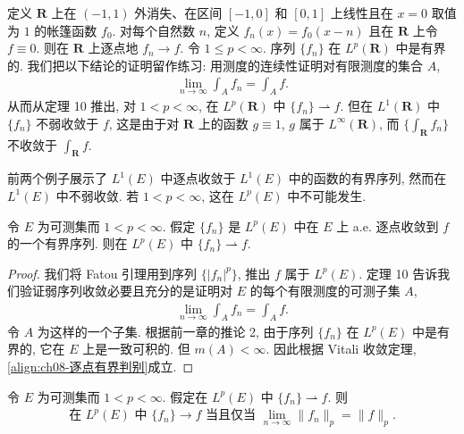\documentclass[../../main.tex]{subfiles}
\begin{document}
\begin{example}\label{example:ch08-平移帐篷}
定义 $\mathbf{R}$ 上在 $(-1,1)$ 外消失、在区间 $[-1,0]$ 和 $[0,1]$ 上线性且在 $x=0$ 取值为 $1$ 的帐篷函数 $f_{0}$. 对每个自然数 $n$, 定义 $f_{n}(x)=f_{0}(x-n)$ 且在 $\mathbf{R}$ 上令 $f\equiv 0$. 则在 $\mathbf{R}$ 上逐点地 $f_{n}\to f$. 令 $1\leqslant p<\infty$. 序列 $\{f_{n}\}$ 在 $L^{p}(\mathbf{R})$ 中是有界的. 我们把以下结论的证明留作练习: 用测度的连续性证明对有限测度的集合 $A$,
\begin{align}
\lim_{n\to\infty}\int_{A}f_{n}=\int_{A}f.\label{align:ch08-平移帐篷}
\end{align}
从而从定理 10 推出, 对 $1<p<\infty$, 在 $L^{p}(\mathbf{R})$ 中 $\{f_{n}\}\rightharpoonup f$. 但在 $L^{1}(\mathbf{R})$ 中 $\{f_{n}\}$ 不弱收敛于 $f$, 这是由于对 $\mathbf{R}$ 上的函数 $g\equiv 1$, $g$ 属于 $L^{\infty}(\mathbf{R})$, 而 $\{\int_{\mathbf{R}}f_{n}\}$ 不收敛于 $\int_{\mathbf{R}}f$.
\end{example}

前两个例子展示了 $L^{1}(E)$ 中逐点收敛于 $L^{1}(E)$ 中的函数的有界序列, 然而在 $L^{1}(E)$ 中不弱收敛. 若 $1<p<\infty$, 这在 $L^{p}(E)$ 中不可能发生.

\begin{theorem}\label{theorem:ch08-逐点有界弱收敛}
令 $E$ 为可测集而 $1<p<\infty$. 假定 $\{f_{n}\}$ 是 $L^{p}(E)$ 中在 $E$ 上 a.e. 逐点收敛到 $f$ 的一个有界序列. 则在 $L^{p}(E)$ 中 $\{f_{n}\}\rightharpoonup f$.
\end{theorem}

\begin{proof}
我们将 Fatou 引理用到序列 $\{|f_{n}|^{p}\}$, 推出 $f$ 属于 $L^{p}(E)$. 定理 10 告诉我们验证弱序列收敛必要且充分的是证明对 $E$ 的每个有限测度的可测子集 $A$,
\begin{align}
\lim_{n\to\infty}\int_{A}f_{n}=\int_{A}f.\label{align:ch08-逐点有界判别}
\end{align}
令 $A$ 为这样的一个子集. 根据前一章的推论 2, 由于序列 $\{f_{n}\}$ 在 $L^{p}(E)$ 中是有界的, 它在 $E$ 上是一致可积的. 但 $m(A)<\infty$. 因此根据 Vitali 收敛定理, \eqref{align:ch08-逐点有界判别}成立.
\end{proof}

\begin{theorem}\label{theorem:ch08-Radon-Riesz}
令 $E$ 为可测集而 $1<p<\infty$. 假定在 $L^{p}(E)$ 中 $\{f_{n}\}\rightharpoonup f$. 则
\begin{align*}
\text{在 }L^{p}(E)\text{ 中 }\{f_{n}\}\to f\text{ 当且仅当 }\lim_{n\to\infty}\|f_{n}\|_{p}=\|f\|_{p}.
\end{align*}
\end{theorem}
\end{document}
